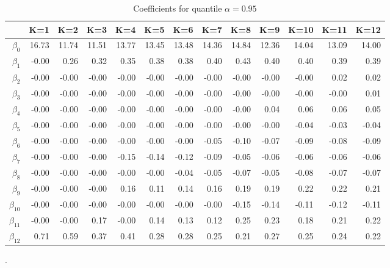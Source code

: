 \begin{table}[ht]
\centering
\begin{tabular}{rrrrrrrrrrrrr}
  \hline
 & K=1 & K=2 & K=3 & K=4 & K=5 & K=6 & K=7 & K=8 & K=9 & K=10 & K=11 & K=12 \\ 
  \hline
$\beta_{0}$ & 16.73 & 11.74 & 11.51 & 13.77 & 13.45 & 13.48 & 14.36 & 14.84 & 12.36 & 14.04 & 13.09 & 14.00 \\ 
  $\beta_{1}$ & -0.00 & 0.26 & 0.32 & 0.35 & 0.38 & 0.38 & 0.40 & 0.43 & 0.40 & 0.40 & 0.39 & 0.39 \\ 
  $\beta_{2}$ & -0.00 & -0.00 & -0.00 & -0.00 & -0.00 & -0.00 & -0.00 & -0.00 & -0.00 & -0.00 & 0.02 & 0.02 \\ 
  $\beta_{3}$ & -0.00 & -0.00 & -0.00 & -0.00 & -0.00 & -0.00 & -0.00 & -0.00 & -0.00 & -0.00 & -0.00 & 0.01 \\ 
  $\beta_{4}$ & -0.00 & -0.00 & -0.00 & -0.00 & -0.00 & -0.00 & -0.00 & -0.00 & 0.04 & 0.06 & 0.06 & 0.05 \\ 
  $\beta_{5}$ & -0.00 & -0.00 & -0.00 & -0.00 & -0.00 & -0.00 & -0.00 & -0.00 & -0.00 & -0.04 & -0.03 & -0.04 \\ 
  $\beta_{6}$ & -0.00 & -0.00 & -0.00 & -0.00 & -0.00 & -0.00 & -0.05 & -0.10 & -0.07 & -0.09 & -0.08 & -0.09 \\ 
  $\beta_{7}$ & -0.00 & -0.00 & -0.00 & -0.15 & -0.14 & -0.12 & -0.09 & -0.05 & -0.06 & -0.06 & -0.06 & -0.06 \\ 
  $\beta_{8}$ & -0.00 & -0.00 & -0.00 & -0.00 & -0.00 & -0.04 & -0.05 & -0.07 & -0.05 & -0.08 & -0.07 & -0.07 \\ 
  $\beta_{9}$ & -0.00 & -0.00 & -0.00 & 0.16 & 0.11 & 0.14 & 0.16 & 0.19 & 0.19 & 0.22 & 0.22 & 0.21 \\ 
  $\beta_{10}$ & -0.00 & -0.00 & -0.00 & -0.00 & -0.00 & -0.00 & -0.00 & -0.15 & -0.14 & -0.11 & -0.12 & -0.11 \\ 
  $\beta_{11}$ & -0.00 & -0.00 & 0.17 & -0.00 & 0.14 & 0.13 & 0.12 & 0.25 & 0.23 & 0.18 & 0.21 & 0.22 \\ 
  $\beta_{12}$ & 0.71 & 0.59 & 0.37 & 0.41 & 0.28 & 0.28 & 0.25 & 0.21 & 0.27 & 0.25 & 0.24 & 0.22 \\ 
   \hline
\end{tabular}
\caption{Coefficients for quantile $\alpha = 0.95$}.
\end{table}
